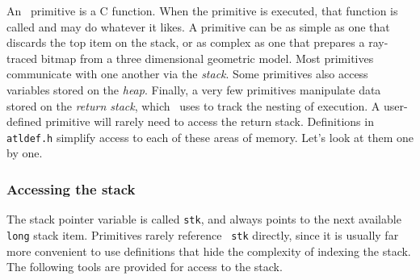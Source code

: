 \documentclass[twocolumn]{article}
\begin{document}
An \atlast\ primitive is a C function.  When the primitive is executed,
that function is called and may do whatever it likes.  A primitive can
be as simple as one that discards the top item on the stack, or as
complex as one that prepares a ray-traced bitmap from a three
dimensional geometric model.  Most primitives communicate with one
another via the {\em stack}.  Some primitives also access variables
stored on the {\em heap}.  Finally, a very few primitives manipulate
data stored on the {\em return stack}, which \atlast\ uses to track the
nesting of execution.  A user-defined primitive will rarely need to
access the return stack.  Definitions in {\tt atldef.h} simplify
access to each of these areas of memory.  Let's look at them one by
one.

\subsubsection{Accessing the stack}

The stack pointer variable is called {\tt stk}, and always points to
the next available {\tt long} stack item.  Primitives rarely reference {\tt
stk} directly, since it is usually far more convenient to use
definitions that hide the complexity of indexing the stack.  The
following tools are provided for access to the stack.
\end{document}
